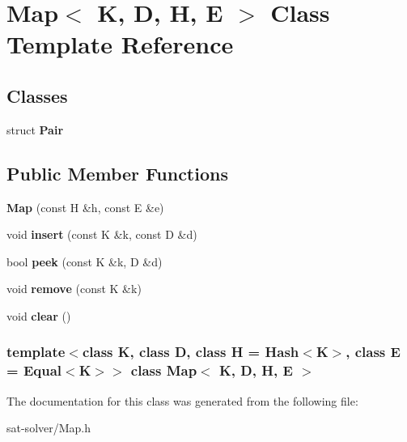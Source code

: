 \hypertarget{classMap}{\section{\-Map$<$ \-K, \-D, \-H, \-E $>$ \-Class \-Template \-Reference}
\label{classMap}
}
\subsection*{\-Classes}
\begin{DoxyCompactItemize}
\item 
struct {\bfseries \-Pair}
\end{DoxyCompactItemize}
\subsection*{\-Public \-Member \-Functions}
\begin{DoxyCompactItemize}
\item 
\hypertarget{classMap_ae414440bb0972d00e2ad5ca4d56342b8}{{\bfseries \-Map} (const \-H \&h, const \-E \&e)}\label{classMap_ae414440bb0972d00e2ad5ca4d56342b8}

\item 
\hypertarget{classMap_ac50d9fbcde7f9bfb8532e29c1338a93b}{void {\bfseries insert} (const \-K \&k, const \-D \&d)}\label{classMap_ac50d9fbcde7f9bfb8532e29c1338a93b}

\item 
\hypertarget{classMap_a7ff0932fba67aec07797962f6189c300}{bool {\bfseries peek} (const \-K \&k, \-D \&d)}\label{classMap_a7ff0932fba67aec07797962f6189c300}

\item 
\hypertarget{classMap_a364147a784045f445ed41ebf3e2df29c}{void {\bfseries remove} (const \-K \&k)}\label{classMap_a364147a784045f445ed41ebf3e2df29c}

\item 
\hypertarget{classMap_af4e6d1eb23e08786d2f790ef86ebff2d}{void {\bfseries clear} ()}\label{classMap_af4e6d1eb23e08786d2f790ef86ebff2d}

\end{DoxyCompactItemize}
\subsubsection*{template$<$class \-K, class \-D, class \-H = \-Hash$<$\-K$>$, class \-E = \-Equal$<$\-K$>$$>$ class Map$<$ K, D, H, E $>$}



\-The documentation for this class was generated from the following file\-:\begin{DoxyCompactItemize}
\item 
sat-\/solver/\-Map.\-h\end{DoxyCompactItemize}
